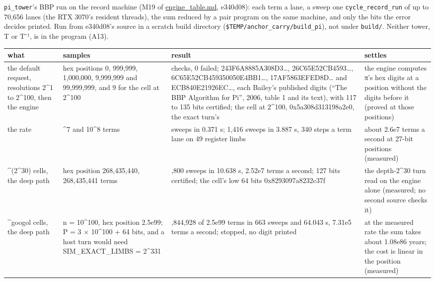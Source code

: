 \texttt{pi\_\allowbreak{}tower}'s BBP run on the record machine (M19 of \hyperref[chap:engine-table]{engine\_\allowbreak{}table.md}, e340d08): each term a lane, a sweep one \texttt{cycle\_\allowbreak{}record\_\allowbreak{}run} of up to 70,656 lanes (the RTX 3070's resident threads), the sum reduced by a pair program on the same machine, and only the bits the error decides printed. Run from e340d08's source in a scratch build directory (\texttt{\$TEMP/\allowbreak{}anchor\_\allowbreak{}carry/\allowbreak{}build\_\allowbreak{}pi}), not under \texttt{build/\allowbreak{}}. Neither tower, T or T⁻¹, is in the program (A13).

{\footnotesize
\setlength{\tabcolsep}{6pt}
\begin{longtable}{>{\RaggedRight\arraybackslash}p{}>{\RaggedRight\arraybackslash}p{}>{\RaggedRight\arraybackslash}p{}>{\RaggedRight\arraybackslash}p{}}
\toprule
what & samples & result & settles \\
\midrule
\endhead
the default request, resolutions 2\textasciicircum{}1 to 2\textasciicircum{}100, then the engine & hex positions 0, 999,999, 1,000,000, 9,999,999 and 99,999,999, and 9 for the cell at 2\textasciicircum{}100 & 41 checks, 0 failed; 243F6A8885A308D3…, 26C65E52CB4593…, 6C65E52CB459350050E4BB1…, 17AF5863EFED8D… and ECB840E21926EC…, each Bailey's published digits (“The BBP Algorithm for Pi”, 2006, table 1 and its text), with 117 to 135 bits certified; the cell at 2\textasciicircum{}100, 0x5a308d313198a2e0, the exact turn's & the engine computes π's hex digits at a position without the digits before it (proved at those positions) \\
the rate & 10\textasciicircum{}7 and 10\textasciicircum{}8 terms & 142 sweeps in 0.371 s; 1,416 sweeps in 3.887 s, 340 steps a term lane on 49 register limbs & about 2.6e7 terms a second at 27-bit positions (measured) \\
2\textasciicircum{}(2\textasciicircum{}30) cells, the deep path & hex position 268,435,440, 268,435,441 terms & 3,800 sweeps in 10.638 s, 2.52e7 terms a second; 127 bits certified; the cell's low 64 bits 0x8293097a8232c37f & the depth-2\textasciicircum{}30 turn read on the engine alone (measured; no second source checks it) \\
2\textasciicircum{}googol cells, the deep path & n = 10\textasciicircum{}100, hex position 2.5e99; P = 3 × 10\textasciicircum{}100 + 64 bits, and a host turn would need SIM\_\allowbreak{}EXACT\_\allowbreak{}LIMBS = 2\textasciicircum{}331 & 46,844,928 of 2.5e99 terms in 663 sweeps and 64.043 s, 7.31e5 terms a second; stopped, no digit printed & at the measured rate the sum takes about 1.08e86 years; the cost is linear in the position (measured) \\

\end{longtable}}
